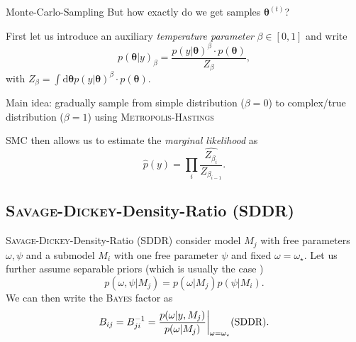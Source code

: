 \documentclass[11pt,aspectratio=1610,dvipsnames]{beamer}
\newcommand{\btheta}{\boldsymbol{\theta}}
\begin{document}
\begin{frame}{Monte-Carlo-Sampling}
	But how exactly do we get samples $\btheta^{(t)}$?
			\begin{tcolorbox}[colback=black!5,colframe=gray!15!black,title={Sequential Monte Carlo (SMC)}]
				First let us introduce an auxiliary \emph{temperature parameter} $\beta\in [0,1]$ and write
				$$p(\btheta|y)_\beta=\frac{p(y|\btheta)^\beta\cdot p(\btheta)}{Z_\beta},$$
				with $Z_\beta=\int\text{d}\btheta p(y|\btheta)^\beta\cdot p(\btheta)$.
				
				Main idea: gradually sample from simple distribution ($\beta=0$) to complex/true distribution ($\beta=1$) using \textsc{Metropolis-Hastings}
				
				SMC then allows us to estimate the \emph{marginal likelihood} as 
				\begin{equation}\label{eq:with_the_hat}
				\hat{p}(y)=\prod_{i}\widehat{\frac{Z_{\beta_i}}{Z_{\beta_{i-1}}}}.
				\end{equation}
		\end{tcolorbox}
\end{frame}


\subsection{\textsc{Savage-Dickey}-Density-Ratio (SDDR)}
\begin{frame}{\textsc{Savage-Dickey}-Density-Ratio (SDDR)}
	consider model $M_j$ with free parameters $\omega,\psi$ and a submodel $M_i$ with one free parameter $\psi$ and fixed $\omega=\omega_\star$. Let us further assume separable priors (which is usually the case \cite{trotta}) $$p(\omega,\psi|M_j)=p(\omega|M_j)p(\psi|M_i).$$
	We can then write the \textsc{Bayes} factor as \cite{trotta} \begin{equation}
	\label{eq:sddr}
	B_{ij}=B_{ji}^{-1}=\frac{p(\omega|y,M_j)}{p(\omega|M_j)}\bigg|_{\omega=\omega_\star}  \text{\hfill (SDDR)}.
	\end{equation}
\end{frame}
%
\end{document}
